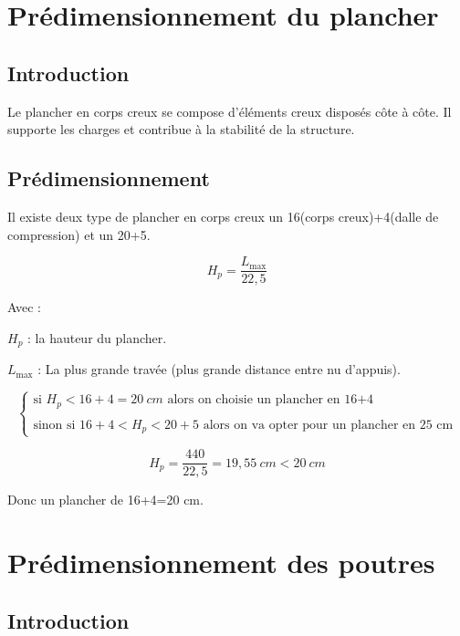\documentclass[12pt,a4paper]{report}
\numberwithin{equation}{section}
\begin{document}
	
	\section{Prédimensionnement du plancher}
	
	
	\subsection{Introduction}
	
	Le plancher en corps creux se compose d’éléments creux disposés côte
	à côte. Il supporte les charges et contribue à la stabilité de la structure.
	
	\subsection{Prédimensionnement}
	
	
	Il existe deux type de plancher en corps creux un 16(corps creux)+4(dalle de compression) et un 20+5.
	
	\begin{equation}
		H_{p} = \dfrac{L_{\max}}{22,5}
		\label{eq:dimension-plancher}
	\end{equation}
	
	Avec :
	
	$H_{p}$ : la hauteur du plancher.
	
	$L_{\max}$ : La plus grande travée (plus grande distance entre nu d'appuis).
	
	
	
	\[ \begin{cases}
		\text{si  } H_{p} < 16+4 = 20~\unit{cm} \text{  alors on choisie un plancher en 16+4} \\\\
		\text{sinon si  } 16+4 < H_{p} < 20+5 \text{  alors on va opter pour un plancher en 25 cm} 
	\end{cases} \]
	
	
	
	\[ H_{p} = \dfrac{440}{22,5} = 19,55 ~\unit{cm} < 20 ~\unit{cm} \]
	
	Donc un plancher de 16+4=20 cm.
	
	
	\section{Prédimensionnement des poutres}
	
	\subsection{Introduction}
	
\end{document}
